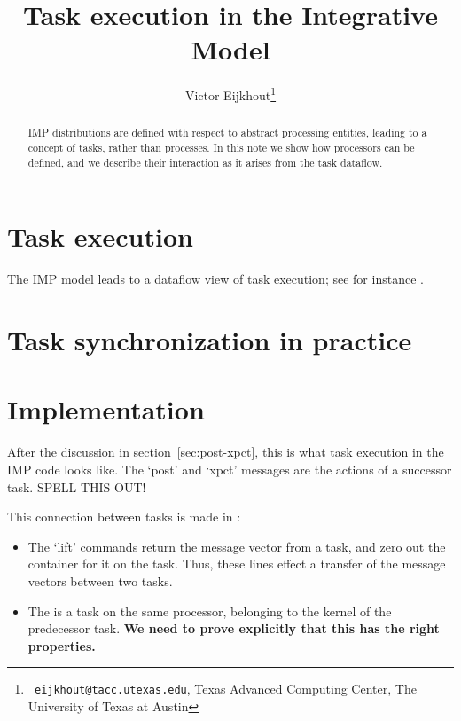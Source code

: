 \documentclass[11pt,fleqn,preprint]{taccreport}
\title[IMP execution]{Task execution in the Integrative Model}
\author[Eijkhout]{Victor Eijkhout\thanks{{\tt
      eijkhout@tacc.utexas.edu}, Texas Advanced Computing Center, The
    University of Texas at Austin}}
\begin{document}
\maketitle

\begin{abstract}
IMP distributions are defined with respect to abstract processing entities,
leading to a concept of tasks, rather than processes. In this note
we show how processors can be defined, and we describe their interaction
as it arises from the task dataflow.
\end{abstract}

\section{Task execution}
\label{sec:exec}

The \ac{IMP} model leads to a dataflow view of task
execution; see for instance .



\section{Task synchronization in practice}


\section{Implementation}

After the discussion in section~\ref{sec:post-xpct}, this is what task execution
in the \ac{IMP} code looks like. The `post' and `xpct' messages are the actions
of a successor task. SPELL THIS OUT!


This connection between tasks is made in :


\begin{itemize}
\item The `lift' commands return the message vector from a task, and zero out
  the container for it on the task. Thus, these lines effect a transfer
  of the message vectors between two tasks.
\item The  is a task on the same processor, belonging
  to the kernel of the predecessor task. \textbf{We need to prove explicitly that
    this has the right properties.}
\end{itemize}



\end{document}
